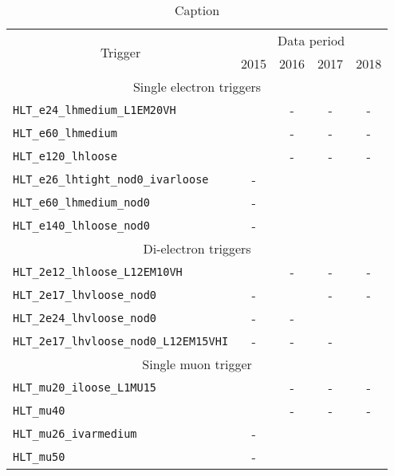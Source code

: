\documentclass[../thesis.tex]{subfiles}
\begin{document}
\begin{table}[!ht]
\centering
\begin{tabular}{p{9cm}|cccc}
\toprule\toprule
\multicolumn{1}{c|}{\multirow{ 2}{*}{Trigger}}	& \multicolumn{4}{c}{Data period} \\
\multicolumn{1}{c|}{}							& 2015	& 2016	& 2017	& 2018 \\
\midrule
\multicolumn{5}{c}{Single electron triggers} \\
\midrule
\verb|HLT_e24_lhmedium_L1EM20VH| 		& \checkmark & - & - & - \\
\verb|HLT_e60_lhmedium|					& \checkmark & - & - & - \\
\verb|HLT_e120_lhloose|					& \checkmark & - & - & - \\
\verb|HLT_e26_lhtight_nod0_ivarloose|	& - & \checkmark & \checkmark & \checkmark \\
\verb|HLT_e60_lhmedium_nod0|			& - & \checkmark & \checkmark & \checkmark \\
\verb|HLT_e140_lhloose_nod0|			& - & \checkmark & \checkmark & \checkmark \\
\midrule
\multicolumn{5}{c}{Di-electron triggers} \\
\midrule
\verb|HLT_2e12_lhloose_L12EM10VH |		& \checkmark & - & - & - \\
\verb|HLT_2e17_lhvloose_nod0| 			& - & \checkmark & - & - \\
\verb|HLT_2e24_lhvloose_nod0| 			& - & - & \checkmark & \checkmark \\
\verb|HLT_2e17_lhvloose_nod0_L12EM15VHI| 	& - & - & - & \checkmark \\
\midrule
\multicolumn{5}{c}{Single muon trigger} \\
\midrule
\verb|HLT_mu20_iloose_L1MU15| 			& \checkmark & - & - & - \\
\verb|HLT_mu40|							& \checkmark & - & - & - \\
\verb|HLT_mu26_ivarmedium| 				& - & \checkmark & \checkmark & \checkmark \\
\verb|HLT_mu50|							& - & \checkmark & \checkmark & \checkmark \\
\bottomrule\bottomrule
\end{tabular}
\caption{\label{tab:ana:trigger}Caption}%
\end{table}
\end{document}

